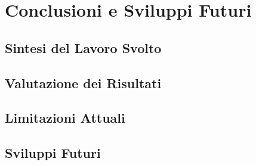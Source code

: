 \chapter{Conclusioni e Sviluppi Futuri}
\label{chap:conclusioni}

\section{Sintesi del Lavoro Svolto}

\section{Valutazione dei Risultati}

\section{Limitazioni Attuali}

\section{Sviluppi Futuri}
